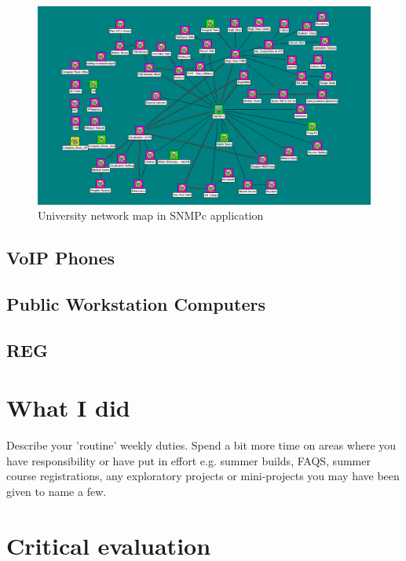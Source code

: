 \documentclass[10pt,a4paper,headinclude=true]{report}
\begin{document}
\begin{figure}[H]
\centering
\centerline{\includegraphics[scale=0.5]{./SNMPc_main}}
\caption{University network map in SNMPc application}
\label{fig:SNMPc_main}
\end{figure}


\section{VoIP Phones}
\section{Public Workstation Computers}
\section{REG}


\chapter{What I did}
Describe your 'routine' weekly duties. Spend a bit more time on areas where you have
responsibility or have put in effort e.g. summer builds, FAQS, summer course
registrations, any exploratory projects or mini-projects you may have been given to
name a few.

\chapter{Critical evaluation}


\end{document}
